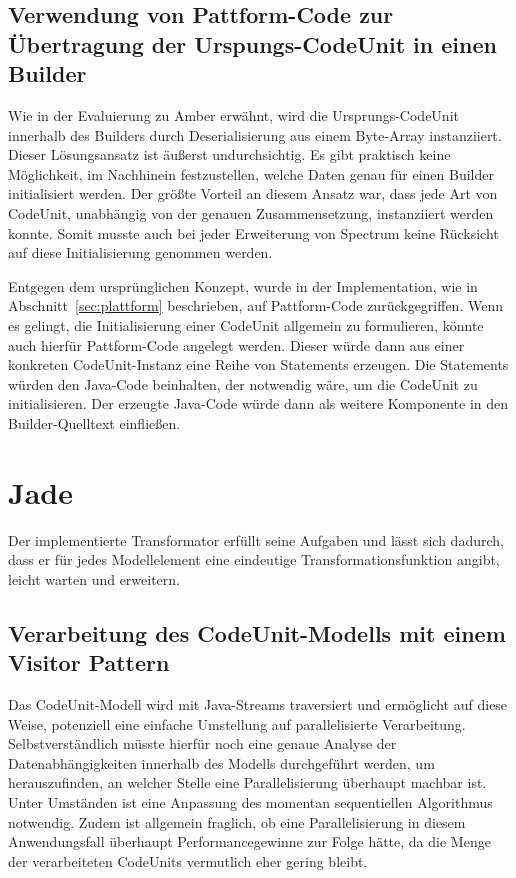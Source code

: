 \documentclass[12pt,oneside,a4paper,parskip]{scrbook}
\begin{document}
\subsection{Verwendung von Pattform-Code zur Übertragung der Urspungs-CodeUnit in einen Builder}

Wie in der Evaluierung zu Amber erwähnt, wird die Ursprungs-CodeUnit innerhalb des Builders durch Deserialisierung aus einem Byte-Array instanziiert. Dieser Lösungsansatz ist äußerst undurchsichtig. Es gibt praktisch keine Möglichkeit, im Nachhinein festzustellen, welche Daten genau für einen Builder initialisiert werden. Der größte Vorteil an diesem Ansatz war, dass jede Art von CodeUnit, unabhängig von der genauen Zusammensetzung, instanziiert werden konnte. Somit musste auch bei jeder Erweiterung von Spectrum keine Rücksicht auf diese Initialisierung genommen werden.

Entgegen dem ursprünglichen Konzept, wurde in der Implementation, wie in Abschnitt~\ref{sec:plattform} beschrieben, auf Pattform-Code zurückgegriffen. Wenn es gelingt, die Initialisierung einer CodeUnit allgemein zu formulieren, könnte auch hierfür Pattform-Code angelegt werden. Dieser würde dann aus einer konkreten CodeUnit-Instanz eine Reihe von Statements erzeugen. Die Statements würden den Java-Code beinhalten, der notwendig wäre, um die CodeUnit zu initialisieren. Der erzeugte Java-Code würde dann als weitere Komponente in den Builder-Quelltext einfließen.

\section{Jade}

Der implementierte Transformator erfüllt seine Aufgaben und lässt sich dadurch, dass er für jedes Modellelement eine eindeutige Transformationsfunktion angibt, leicht warten und erweitern.

\subsection{Verarbeitung des CodeUnit-Modells mit einem Visitor Pattern}

Das CodeUnit-Modell wird mit Java-Streams traversiert und ermöglicht auf diese Weise, potenziell eine einfache Umstellung auf parallelisierte Verarbeitung. Selbstverständlich müsste hierfür noch eine genaue Analyse der Datenabhängigkeiten innerhalb des Modells durchgeführt werden, um herauszufinden, an welcher Stelle eine Parallelisierung überhaupt machbar ist. Unter Umständen ist eine Anpassung des momentan sequentiellen Algorithmus notwendig. Zudem ist allgemein fraglich, ob eine Parallelisierung in diesem Anwendungsfall überhaupt Performancegewinne zur Folge hätte, da die Menge der verarbeiteten CodeUnits vermutlich eher gering bleibt.
\end{document}
